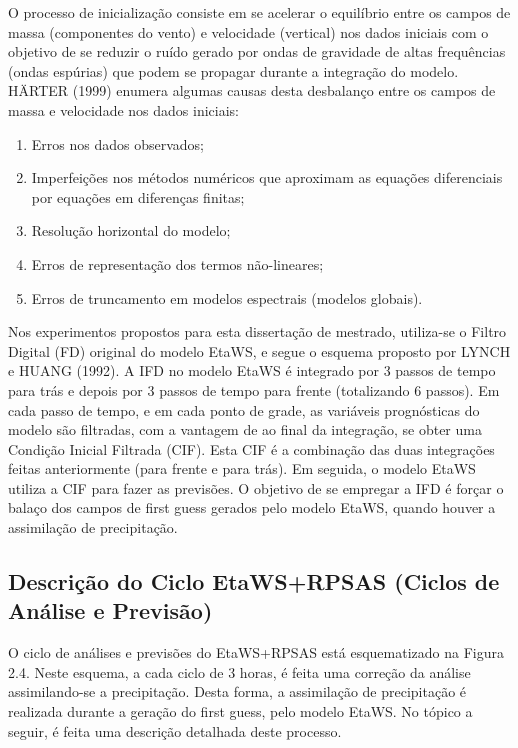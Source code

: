 O processo de inicialização consiste em se acelerar o equilíbrio entre os campos de massa (componentes do vento) e velocidade (vertical) nos dados iniciais com o objetivo de se reduzir o ruído gerado por ondas de gravidade de altas frequências (ondas espúrias) que podem se propagar durante a integração do modelo. H\"{A}RTER (1999) enumera algumas causas desta desbalanço entre os campos de massa e velocidade nos dados iniciais:

\begin{enumerate}
\item Erros nos dados observados;
\item Imperfeições nos métodos numéricos que aproximam as equações diferenciais por equações em diferenças finitas;
\item Resolução horizontal do modelo;
\item Erros de representação dos termos não-lineares;
\item Erros de truncamento em modelos espectrais (modelos globais).
\end{enumerate}

Nos experimentos propostos para esta dissertação de mestrado, utiliza-se o Filtro Digital (FD) original do modelo EtaWS, e segue o esquema proposto por LYNCH e HUANG (1992). A IFD no modelo EtaWS é integrado por 3 passos de tempo para trás e depois por 3 passos de tempo para frente (totalizando 6 passos). Em cada passo de tempo, e em cada ponto de grade, as variáveis prognósticas do modelo são filtradas, com a vantagem de ao final da integração, se obter uma Condição Inicial Filtrada (CIF). Esta CIF é a combinação das duas integrações feitas anteriormente (para frente e para trás). Em seguida, o modelo EtaWS utiliza a CIF para fazer as previsões. O objetivo de se empregar a IFD é forçar o balaço dos campos de first guess gerados pelo modelo EtaWS, quando houver a assimilação de precipitação.

\subsection{Descrição do Ciclo EtaWS+RPSAS (Ciclos de Análise e Previsão)}

O ciclo de análises e previsões do EtaWS+RPSAS está esquematizado na Figura 2.4. Neste esquema, a cada ciclo de 3 horas, é feita uma correção da análise assimilando-se a precipitação. Desta forma, a assimilação de precipitação é realizada durante a geração do first guess, pelo modelo EtaWS. No tópico a seguir, é feita uma descrição detalhada deste processo.

